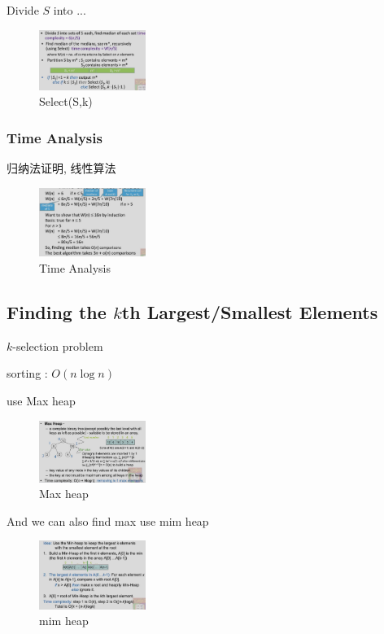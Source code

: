 Divide $S$ into ...

\begin{figure}[H]
    \centering
    \includegraphics[width=0.309\textwidth]{pic/DAA3/Select(S,k)}
    \caption{Select(S,k)}
\end{figure}


\subsubsection{Time Analysis}
归纳法证明, 线性算法

\begin{figure}[H]
    \centering
    \includegraphics[width=0.309\textwidth]{pic/DAA3/Time Analysis}
    \caption{Time Analysis}
\end{figure}

\subsection{Finding the \texorpdfstring{$k$}.th Largest/Smallest Elements}
$k$-selection problem

sorting : $O(n\log n)$

use Max heap
\begin{figure}[H]
    \centering
    \includegraphics[width=0.309\textwidth]{pic/DAA3/Max heap}
    \caption{Max heap}
\end{figure}

And we can also find max use mim heap

\begin{figure}[H]
    \centering
    \includegraphics[width=0.309\textwidth]{pic/DAA3/mim heap}
    \caption{mim heap}
\end{figure}


